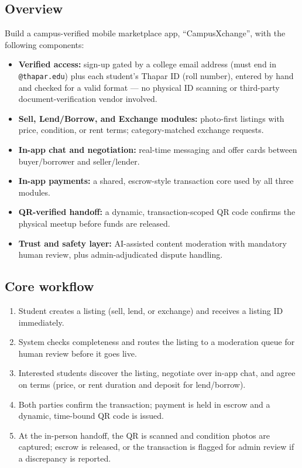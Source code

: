 \documentclass[11pt,a4paper]{article}
\begin{document}
\subsection{Overview}
Build a campus-verified mobile marketplace app, ``CampusXchange'', with the
following components:
\begin{itemize}[leftmargin=0.7cm]
    \item \textbf{Verified access:} sign-up gated by a college email address (must end in \texttt{@thapar.edu}) plus each student's Thapar ID (roll number), entered by hand and checked for a valid format — no physical ID scanning or third-party document-verification vendor involved.
    \item \textbf{Sell, Lend/Borrow, and Exchange modules:} photo-first listings with price, condition, or rent terms; category-matched exchange requests.
    \item \textbf{In-app chat and negotiation:} real-time messaging and offer cards between buyer/borrower and seller/lender.
    \item \textbf{In-app payments:} a shared, escrow-style transaction core used by all three modules.
    \item \textbf{QR-verified handoff:} a dynamic, transaction-scoped QR code confirms the physical meetup before funds are released.
    \item \textbf{Trust and safety layer:} AI-assisted content moderation with mandatory human review, plus admin-adjudicated dispute handling.
\end{itemize}

\subsection{Core workflow}
\begin{enumerate}[leftmargin=0.7cm]
    \item Student creates a listing (sell, lend, or exchange) and receives a listing ID immediately.
    \item System checks completeness and routes the listing to a moderation queue for human review before it goes live.
    \item Interested students discover the listing, negotiate over in-app chat, and agree on terms (price, or rent duration and deposit for lend/borrow).
    \item Both parties confirm the transaction; payment is held in escrow and a dynamic, time-bound QR code is issued.
    \item At the in-person handoff, the QR is scanned and condition photos are captured; escrow is released, or the transaction is flagged for admin review if a discrepancy is reported.
\end{enumerate}
\end{document}
